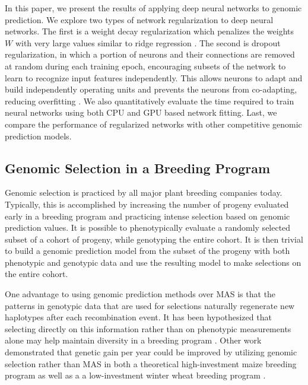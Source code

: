 In this paper, we present the results of applying deep neural networks
to genomic prediction. We explore two types of network regularization
to deep neural networks. The first is a weight decay regularization
which penalizes the weights $W$ with very large values 
similar to ridge regression \citep{krogh1992}. The second is dropout 
regularization, in which a portion of neurons and their connections are removed 
at random during each training epoch, encouraging subsets of the network to learn 
to recognize input features independently. This allows neurons to adapt 
and build independently operating units and prevents the 
neurons from co-adapting, reducing overfitting \citep{srivastava2014}.  
We also quantitatively evaluate the time required to train neural networks
using both CPU and GPU based network fitting. Last, we compare the 
performance of regularized networks with other competitive genomic prediction models.


\subsection*{Genomic Selection in a Breeding Program}

Genomic selection is practiced by all major plant breeding companies today. 
Typically, this is accomplished by increasing the number of progeny evaluated
early in a breeding program and practicing intense selection based on genomic
prediction values. It is possible to phenotypically evaluate a randomly
selected subset of a cohort of progeny, while genotyping the entire cohort. It is
then trivial to build a genomic prediction model from the subset of the progeny
with both phenotypic and genotypic data and use the resulting model to make 
selections on the entire cohort. 

One advantage to using genomic prediction methods over MAS is that the 
patterns in genotypic data that are used for selections naturally regenerate
new haplotypes after each recombination event. It has been hypothesized that 
selecting directly on this information rather than on phenotypic measurements
alone may help maintain diversity in a breeding program \citep{daetwyler2007}.
Other work demonstrated that genetic gain per year could be improved
by utilizing genomic selection rather than MAS in both a theoretical high-investment
maize breeding program as well as a a low-investment winter wheat breeding program \citep{heffner2010}.

